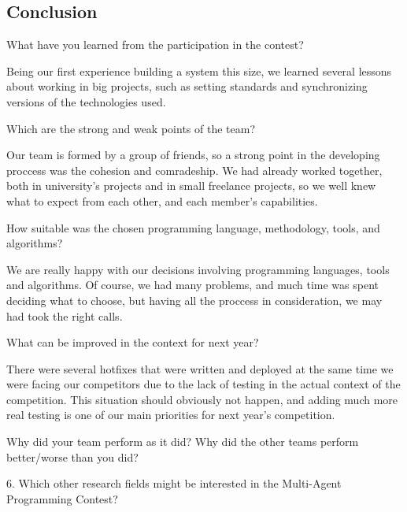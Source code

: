 \subsection{Conclusion}
\setcounter{question}{0}
\begin{question}
What have you learned from the participation in the contest?
\end{question}

Being our first experience building a system this size, we learned several 
lessons about working in big projects, such as setting standards and 
synchronizing versions of the technologies used.

\begin{question}
Which are the strong and weak points of the team?
\end{question}

    Our team is formed by a group of friends, so a strong point in the
    developing proccess was the cohesion and comradeship. We had
    already worked together, both in university's projects and in
    small freelance projects, so we well knew what to expect from each other,
    and each member's capabilities.

\begin{question}  
How suitable was the chosen programming language, methodology, tools, and
algorithms?
\end{question}

    We are really happy with our decisions involving programming languages,
    tools and algorithms. Of course, we had many problems, and much time was
    spent deciding what to choose, but having all the proccess in
    consideration, we may had took the right calls.

\begin{question}
What can be improved in the context for next year?
\end{question}

There were several hotfixes that were written and deployed at the same 
time we were facing our competitors due to the lack of testing in the 
actual context of the competition. This situation should obviously not 
happen, and adding much more real testing is one of our main priorities 
for next year's competition.

\begin{question}
Why did your team perform as it did? Why did the other teams perform
better/worse than you did?
\end{question}

\begin{question}
6. Which other research fields might be interested in the Multi-Agent
Programming Contest?
\end{question}

